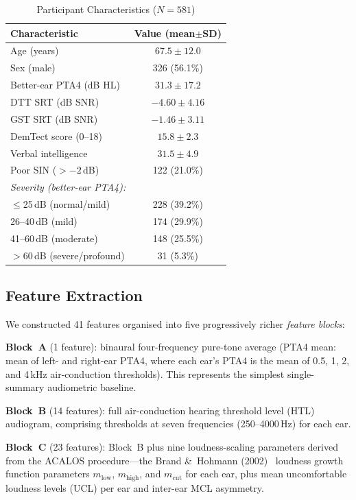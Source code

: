 \documentclass[conference]{IEEEtran}
\begin{document}
\begin{table}[h]
\caption{Participant Characteristics ($N=581$)}
\label{tab:demographics}
\centering\small
\begin{tabular}{lc}
\toprule
Characteristic & Value (mean$\pm$SD) \\
\midrule
Age (years)           & $67.5 \pm 12.0$ \\
Sex (male)            & 326 (56.1\%) \\
Better-ear PTA4 (dB HL)   & $31.3 \pm 17.2$ \\
DTT SRT (dB SNR)      & $-4.60 \pm 4.16$ \\
GST SRT (dB SNR)      & $-1.46 \pm 3.11$ \\
DemTect score (0--18) & $15.8 \pm 2.3$ \\
Verbal intelligence   & $31.5 \pm 4.9$ \\
Poor SIN ($>-2$\,dB)  & 122 (21.0\%) \\
\midrule
\multicolumn{2}{l}{\textit{Severity (better-ear PTA4):}} \\
$\leq$25\,dB (normal/mild) & 228 (39.2\%) \\
26--40\,dB (mild)          & 174 (29.9\%) \\
41--60\,dB (moderate)      & 148 (25.5\%) \\
$>$60\,dB (severe/profound) & 31 (5.3\%) \\
\bottomrule
\end{tabular}
\end{table}

\subsection{Feature Extraction}

We constructed 41 features organised into five progressively richer
\textit{feature blocks}:

\textbf{Block~A} (1 feature): binaural four-frequency pure-tone average
(PTA4 mean: mean of left- and right-ear PTA4, where each ear's PTA4 is the
mean of 0.5, 1, 2, and 4\,kHz air-conduction thresholds).  This represents
the simplest single-summary audiometric baseline.

\textbf{Block~B} (14 features): full air-conduction hearing threshold level
(HTL) audiogram, comprising thresholds at seven frequencies
(250--4000\,Hz) for each ear.

\textbf{Block~C} (23 features): Block~B plus nine loudness-scaling
parameters derived from the ACALOS procedure---the Brand \&\ Hohmann
(2002)~\cite{Brand2002} loudness growth function parameters
$m_\text{low}$, $m_\text{high}$, and $m_\text{cut}$ for each ear, plus
mean uncomfortable loudness levels (UCL) per ear and inter-ear MCL
asymmetry.
\end{document}
